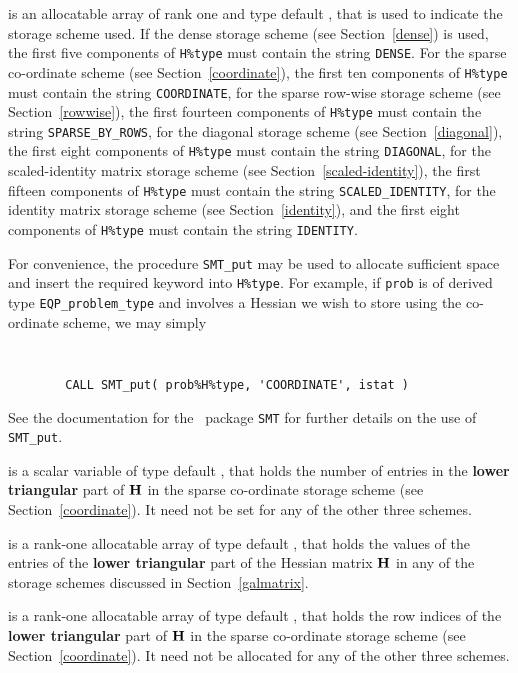 \documentclass{galahad}
\newcommand{\packagename}{EQP}
\begin{document}
\begin{description}
\begin{description}
 is an allocatable array of rank one and type default \character, 
that is used to indicate the storage scheme used. If the dense storage scheme 
(see Section~\ref{dense}) is used, 
the first five components of {\tt H\%type} must contain the
string {\tt DENSE}.
For the sparse co-ordinate scheme (see Section~\ref{coordinate}), 
the first ten components of {\tt H\%type} must contain the
string {\tt COORDINATE},  
for the sparse row-wise storage scheme (see Section~\ref{rowwise}),
the first fourteen components of {\tt H\%type} must contain the
string {\tt SPARSE\_BY\_ROWS},
for the diagonal storage scheme (see Section~\ref{diagonal}),
the first eight components of {\tt H\%type} must contain the
string {\tt DIAGONAL},
for the scaled-identity matrix storage scheme
(see Section~\ref{scaled-identity}),
the first fifteen components of {\tt H\%type} must contain the
string {\tt SCALED\_IDENTITY},
for the identity matrix storage scheme
(see Section~\ref{identity}), and
the first eight components of {\tt H\%type} must contain the
string {\tt IDENTITY}.

For convenience, the procedure {\tt SMT\_put} 
may be used to allocate sufficient space and insert the required keyword
into {\tt H\%type}.
For example, if {\tt prob} is of derived type {\tt \packagename\_problem\_type}
and involves a Hessian we wish to store using the co-ordinate scheme,
we may simply
{\tt 
\begin{verbatim}
        CALL SMT_put( prob%H%type, 'COORDINATE', istat )
\end{verbatim}
}
\noindent
See the documentation for the \galahad\ package {\tt SMT} 
for further details on the use of {\tt SMT\_put}.

 is a scalar variable of type default \integer, that 
holds the number of entries in the {\bf lower triangular} part of ${\mathbf{H}}$
in the sparse co-ordinate storage scheme (see Section~\ref{coordinate}). 
It need not be set for any of the other three schemes.

 is a rank-one allocatable array of type default \realdp, that holds
the values of the entries of the {\bf lower triangular} part
of the Hessian matrix ${\mathbf{H}}$ in any of the 
storage schemes discussed in Section~\ref{galmatrix}.

 is a rank-one allocatable array of type default \integer,
that holds the row indices of the {\bf lower triangular} part of ${\mathbf{H}}$ 
in the sparse co-ordinate storage
scheme (see Section~\ref{coordinate}). 
It need not be allocated for any of the other three schemes.


\end{description}
\end{description}
\end{document}
